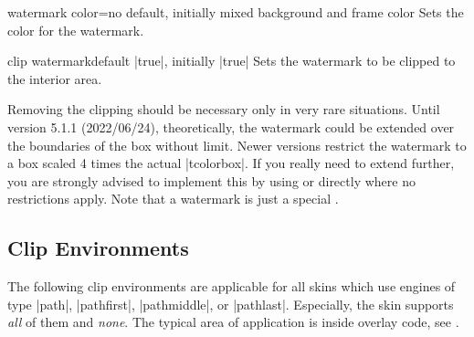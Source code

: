 \begin{docTcbKey}{watermark color}{=}{no default, initially mixed background and frame color}
  Sets the color for the watermark.
\begin{dispExample}

\begin{tcolorbox}[enhanced,title=My title,watermark text=My Watermark,
  watermark color=yellow!50!red]
\lipsum[1]
\end{tcolorbox}
\end{dispExample}
\end{docTcbKey}

\clearpage

\begin{docTcbKey}{clip watermark}{}{default |true|, initially |true|}
  Sets the watermark to be clipped to the interior area.
\begin{dispExample}

\begin{tcolorbox}[title=Clip (default),clip watermark]
\lipsum[1]
\end{tcolorbox}

\begin{tcolorbox}[title=No clip,clip watermark=false]
\lipsum[1]
\end{tcolorbox}%
\end{dispExample}
\end{docTcbKey}

\begin{marker}
Removing the clipping should be necessary only in very rare situations. Until
version 5.1.1 (2022/06/24), theoretically, the watermark could be extended
over the boundaries of the box without limit. Newer versions restrict the
watermark to a box scaled 4 times the actual |tcolorbox|.
If you really need to extend further, you are strongly advised to implement
this by using  or  directly
where no restrictions apply.
Note that a watermark is just a special .
\end{marker}


\clearpage
\subsection{Clip Environments}\label{subsec:clipping}
The following clip environments are applicable for all skins which
use engines of type |path|, |pathfirst|, |pathmiddle|, or |pathlast|.
Especially, the skin  supports \emph{all} of them
and  \emph{none}. The typical area of application
is inside overlay code, see .


